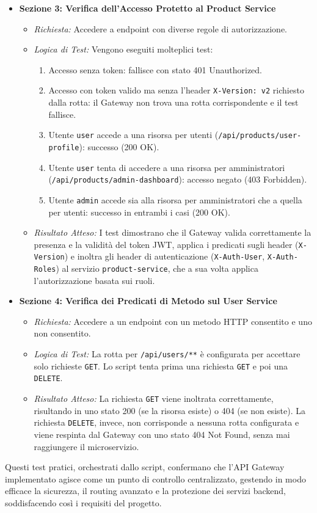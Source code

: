 \begin{itemize}
    \item \textbf{Sezione 3: Verifica dell'Accesso Protetto al Product Service}
    \begin{itemize}
        \item \textit{Richiesta:} Accedere a endpoint con diverse regole di autorizzazione.
        \item \textit{Logica di Test:} Vengono eseguiti molteplici test:
            \begin{enumerate}
                \item Accesso senza token: fallisce con stato 401 Unauthorized.
                \item Accesso con token valido ma senza l'header \texttt{X-Version: v2} richiesto dalla rotta: il Gateway non trova una rotta corrispondente e il test fallisce.
                \item Utente \texttt{user} accede a una risorsa per utenti (\texttt{/api/products/user-profile}): successo (200 OK).
                \item Utente \texttt{user} tenta di accedere a una risorsa per amministratori (\texttt{/api/products/admin-dashboard}): accesso negato (403 Forbidden).
                \item Utente \texttt{admin} accede sia alla risorsa per amministratori che a quella per utenti: successo in entrambi i casi (200 OK).
            \end{enumerate}
        \item \textit{Risultato Atteso:} I test dimostrano che il Gateway valida correttamente la presenza e la validità del token JWT, applica i predicati sugli header (\texttt{X-Version}) e inoltra gli header di autenticazione (\texttt{X-Auth-User}, \texttt{X-Auth-Roles}) al servizio \texttt{product-service}, che a sua volta applica l'autorizzazione basata sui ruoli.
    \end{itemize}

    \item \textbf{Sezione 4: Verifica dei Predicati di Metodo sul User Service}
    \begin{itemize}
        \item \textit{Richiesta:} Accedere a un endpoint con un metodo HTTP consentito e uno non consentito.
        \item \textit{Logica di Test:} La rotta per \texttt{/api/users/**} è configurata per accettare solo richieste \texttt{GET}. Lo script tenta prima una richiesta \texttt{GET} e poi una \texttt{DELETE}.
        \item \textit{Risultato Atteso:} La richiesta \texttt{GET} viene inoltrata correttamente, risultando in uno stato 200 (se la risorsa esiste) o 404 (se non esiste). La richiesta \texttt{DELETE}, invece, non corrisponde a nessuna rotta configurata e viene respinta dal Gateway con uno stato 404 Not Found, senza mai raggiungere il microservizio.
    \end{itemize}
\end{itemize}

Questi test pratici, orchestrati dallo script, confermano che l'API Gateway implementato agisce come un punto di controllo centralizzato, gestendo in modo efficace la sicurezza, il routing avanzato e la protezione dei servizi backend, soddisfacendo così i requisiti del progetto.